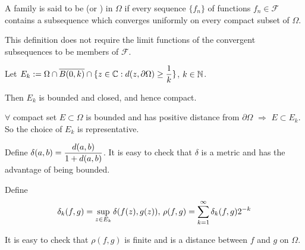 A family is said to be  (or ) in  $ \Omega $ if every sequence  $ \{f_n\} $ of functions  $ f_n\in \mathscr{F} $ contains a subsequence which converges uniformly on every compact subset of  $ \Omega $.

\begin{remark}
    This definition does not require the limit functions of the convergent subsequences to be members of  $ \mathscr{F} $. 
\end{remark}
Let  $ E_k:=\Omega\cap \overline{B(0,k)}\cap \{z\in \mathbb C:d(z,\partial \Omega) \geq \displaystyle\frac{1}{k}\} $,  $ k\in \mathbb N $.

Then  $ E_k  $ is bounded and closed, and hence compact.

$ \forall  $ compact set  $ E\subset \Omega  $ is bounded and has positive distance from  $ \partial \Omega $ $ \Rightarrow  $  $ E\subset E_k $. So the choice of  $ E_k  $ is representative.

Define  $ \delta(a,b)=\displaystyle\frac{d(a,b)}{1+d(a,b)} $. It is easy to check that  $ \delta  $ is a metric and has the advantage of being bounded.

Define  \begin{equation}\label{eq:6.1.1:definition of delta_k in function space}
    \delta_k(f,g)=\displaystyle\sup_{z\in E_k}\delta(f(z),g(z)) ,\,\rho(f,g)=\displaystyle\sum_{k=1}^\infty\delta_k(f,g)2^{-k} 
\end{equation}

It is easy to check that  $ \rho(f,g) $ is finite and is a distance between  $ f $ and  $ g $ on  $ \Omega $.  

